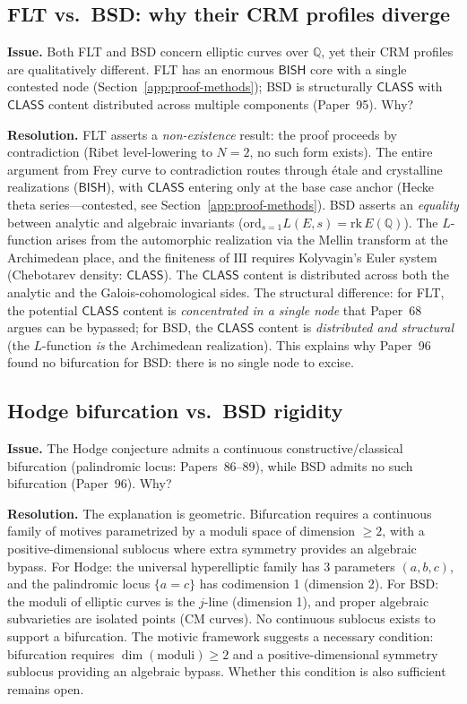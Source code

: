 \documentclass[11pt,a4paper]{article}
\newcommand{\Sha}{\mathrm{III}}
\theoremstyle{plain}
\theoremstyle{definition}
\newcommand{\BISH}{\textsf{BISH}}
\newcommand{\CLASS}{\textsf{CLASS}}
\newcommand{\Q}{\mathbb{Q}}
\begin{document}
\subsection{FLT vs.\ BSD: why their CRM profiles diverge}

\textbf{Issue.} Both FLT and BSD concern elliptic curves over $\Q$, yet their CRM profiles are qualitatively different. FLT has an enormous $\BISH$ core with a single contested node (Section~\ref{app:proof-methods}); BSD is structurally $\CLASS$ with $\CLASS$ content distributed across multiple components (Paper~95). Why?

\textbf{Resolution.} FLT asserts a \emph{non-existence} result: the proof proceeds by contradiction (Ribet level-lowering to $N = 2$, no such form exists). The entire argument from Frey curve to contradiction routes through \'etale and crystalline realizations ($\BISH$), with $\CLASS$ entering only at the base case anchor (Hecke theta series---contested, see Section~\ref{app:proof-methods}). BSD asserts an \emph{equality} between analytic and algebraic invariants ($\mathrm{ord}_{s=1} L(E,s) = \mathrm{rk}\, E(\Q)$). The $L$-function arises from the automorphic realization via the Mellin transform at the Archimedean place, and the finiteness of $\Sha$ requires Kolyvagin's Euler system (Chebotarev density: $\CLASS$). The $\CLASS$ content is distributed across both the analytic and the Galois-cohomological sides. The structural difference: for FLT, the potential $\CLASS$ content is \emph{concentrated in a single node} that Paper~68 argues can be bypassed; for BSD, the $\CLASS$ content is \emph{distributed and structural} (the $L$-function \emph{is} the Archimedean realization). This explains why Paper~96 found no bifurcation for BSD: there is no single node to excise.

\subsection{Hodge bifurcation vs.\ BSD rigidity}

\textbf{Issue.} The Hodge conjecture admits a continuous constructive/classical bifurcation (palindromic locus: Papers~86--89), while BSD admits no such bifurcation (Paper~96). Why?

\textbf{Resolution.} The explanation is geometric. Bifurcation requires a continuous family of motives parametrized by a moduli space of dimension $\geq 2$, with a positive-dimensional sublocus where extra symmetry provides an algebraic bypass. For Hodge: the universal hyperelliptic family has 3 parameters $(a,b,c)$, and the palindromic locus $\{a = c\}$ has codimension 1 (dimension 2). For BSD: the moduli of elliptic curves is the $j$-line (dimension 1), and proper algebraic subvarieties are isolated points (CM curves). No continuous sublocus exists to support a bifurcation. The motivic framework suggests a necessary condition: bifurcation requires $\dim(\text{moduli}) \geq 2$ and a positive-dimensional symmetry sublocus providing an algebraic bypass. Whether this condition is also sufficient remains open.
\end{document}
